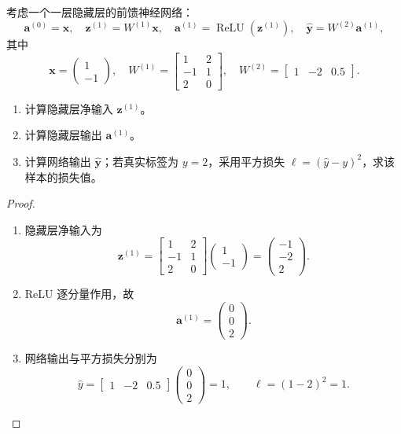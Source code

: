 考虑一个一层隐藏层的前馈神经网络：
\[
\bm{a}^{(0)} = \bm{x},\quad
\bm{z}^{(1)} = W^{(1)} \bm{x},\quad
\bm{a}^{(1)} = \operatorname{ReLU}(\bm{z}^{(1)}),\quad
\hat{\bm{y}} = W^{(2)} \bm{a}^{(1)},
\]
其中
\[
\bm{x} = \begin{pmatrix} 1 \\ -1 \end{pmatrix},\quad
W^{(1)} = \begin{bmatrix}
    1 & 2 \\
    -1 & 1 \\
    2 & 0
\end{bmatrix},\quad
W^{(2)} = \begin{bmatrix} 1 & -2 & 0.5 \end{bmatrix}.
\]
\begin{enumerate}
    \item 计算隐藏层净输入 $\bm{z}^{(1)}$。
    \item 计算隐藏层输出 $\bm{a}^{(1)}$。
    \item 计算网络输出 $\hat{\bm{y}}$；若真实标签为 $y = 2$，采用平方损失 $\ell = (\hat{y} - y)^2$，求该样本的损失值。
\end{enumerate}

\begin{proof}
    \begin{enumerate}
        \item 隐藏层净输入为
        \[
            \bm{z}^{(1)}
            = \begin{bmatrix}
                1 & 2 \\
                -1 & 1 \\
                2 & 0
              \end{bmatrix}
              \begin{pmatrix}1\\-1\end{pmatrix}
            = \boxed{\begin{pmatrix}-1\\-2\\2\end{pmatrix}}.
        \]
        \item ReLU 逐分量作用，故
        \[
            \bm{a}^{(1)}
            = \boxed{\begin{pmatrix}0\\0\\2\end{pmatrix}}.
        \]
        \item 网络输出与平方损失分别为
        \[
            \hat y
            = \begin{bmatrix}1&-2&0.5\end{bmatrix}
              \begin{pmatrix}0\\0\\2\end{pmatrix}
            = \boxed{1},
            \qquad
            \ell=(1-2)^2=\boxed{1}.
        \]
    \end{enumerate}
\end{proof}

